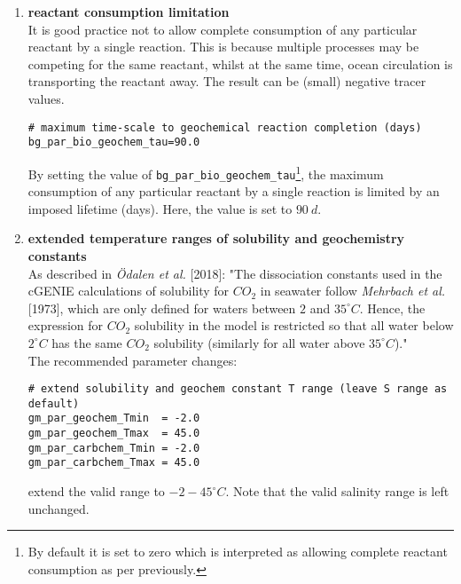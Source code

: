 \documentclass[11pt,fleqn]{book} %
\begin{document}
\begin{itemize}[noitemsep]
\begin{enumerate}[noitemsep]
\vspace{1mm}
\item \textbf{reactant consumption limitation}
\\It is good practice not to allow complete consumption of any particular reactant by a single reaction. This is because multiple processes may be competing for the same reactant, whilst at the same time, ocean circulation is transporting the reactant away. The result can be (small) negative tracer values.
\small\vspace{-1mm}\begin{verbatim}
# maximum time-scale to geochemical reaction completion (days)
bg_par_bio_geochem_tau=90.0
\end{verbatim}\vspace{-1mm}\normalsize
By setting the value of \texttt{bg\_par\_bio\_geochem\_tau}\footnote{By default it is set to zero which is interpreted as allowing complete reactant consumption as per previously.}, the maximum consumption of any particular reactant by a single reaction is limited by an imposed lifetime (days). Here, the value is set to \(90\:d\).
\vspace{1mm}
\item \textbf{extended temperature ranges of solubility and geochemistry constants}
\\As described in \textit{Ödalen et al.} [2018]: "The dissociation constants used in the cGENIE calculations of solubility for \(CO_{2}\) in seawater follow \textit{Mehrbach et al.} [1973], which are only defined for waters between \(2\) and \(35^{\circ}C\). Hence, the expression for \(CO_{2}\) solubility in the model is restricted so that all water below \(2^{\circ}C\) has the same \(CO_{2}\) solubility (similarly for all water above \(35^{\circ}C\))."
\\The recommended parameter changes:
\small\vspace{-1mm}\begin{verbatim}
# extend solubility and geochem constant T range (leave S range as default)
gm_par_geochem_Tmin  = -2.0
gm_par_geochem_Tmax  = 45.0
gm_par_carbchem_Tmin = -2.0
gm_par_carbchem_Tmax = 45.0
\end{verbatim}\vspace{-1mm}\normalsize
extend the valid range to \(-2 - 45^{\circ}C\). Note that the valid salinity range is left unchanged.
\end{enumerate}


\end{itemize}
\end{document}

